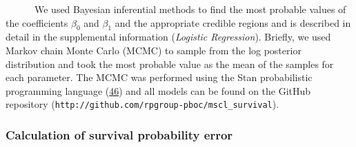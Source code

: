 ~ ~ ~
~We
used
Bayesian
inferential
methods
to
find
the
most
probable
values
of the
coefficients
\(\beta_0\)
and
\(\beta_1\)
and
the
appropriate
credible
regions
and is
described
in
detail
in the
supplemental
information
(\emph{Logistic
Regression}).
Briefly,
we
used
Markov
chain
Monte
Carlo
(MCMC)
to
sample
from
the
log
posterior
distribution
and
took
the
most
probable
value
as the
mean
of the
samples
for
each
parameter.
The
MCMC
was
performed
using
the
Stan
probabilistic
programming
language
(\protect\hyperlink{ref-carpenter2017}{46})
and
all
models
can be
found
on the
GitHub
repository
(\texttt{http://github.com/rpgroup-pboc/mscl\_survival}).

\subsubsection{Calculation
of
survival
probability
error}\label{calculation-of-survival-probability-error}

